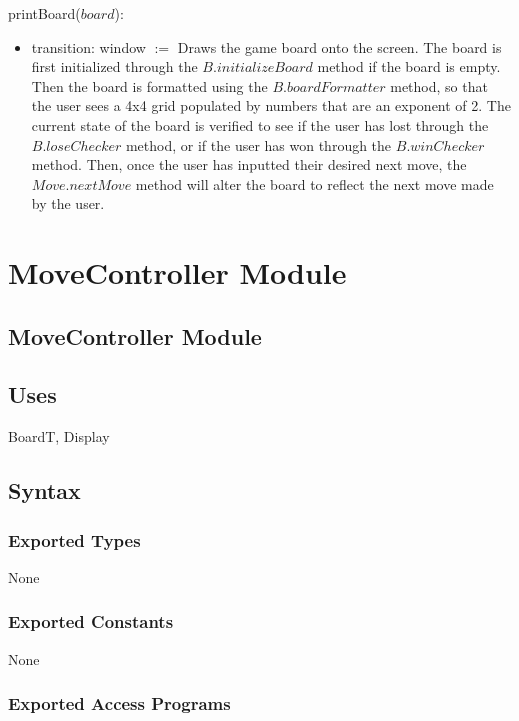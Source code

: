 \documentclass[12pt]{article}
\begin{document}
\noindent printBoard($board$):
\begin{itemize}
\item transition: window $:=$ Draws the game board onto the screen. The board is first initialized through the $B.initializeBoard$ method if the board is empty. Then the board is formatted using the $B.boardFormatter$ method, so that the user sees a 4x4 grid populated by numbers that are an exponent of 2. The current state of the board is verified to see if the user has lost through the $B.loseChecker$ method, or if the user has won through the $B.winChecker$ method. Then, once the user has inputted their desired next move, the $Move.nextMove$ method will alter the board to reflect the next move made by the user.
\end{itemize}

\newpage

\section* {MoveController Module}

\subsection* {MoveController Module}

\subsection* {Uses}

BoardT, Display

\subsection* {Syntax}

\subsubsection* {Exported Types}

None

\subsubsection* {Exported Constants}

None

\subsubsection* {Exported Access Programs}
\end{document}
